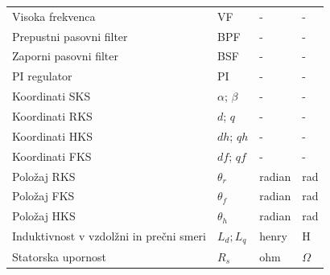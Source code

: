 \documentclass[a4paper,twoside,openright,12pt,slovene]{book}
\begin{document}
\begin{center}
\begin{tabular}{*{4}{l}}
        Visoka frekvenca                                           & VF                                     & -                    & -                      \\
        Prepustni pasovni filter                                   & BPF                                    & -                    & -                      \\
        Zaporni pasovni filter                                     & BSF                                    & -                    & -                      \\
        PI regulator                                               & PI                                     & -                    & -                      \\                                                    
        Koordinati SKS                                             & $\alpha$; $\beta$                      & -                    & -                      \\
        Koordinati RKS                                             & $d$; $q$                               & -                    & -                      \\
        Koordinati HKS                                             & $dh$; $qh$                             & -                    & -                      \\
        Koordinati FKS                                             & $df$; $qf$                             & -                    & -                      \\
        Položaj RKS                                                & $\theta_{r}$                           & radian               & rad                    \\
        Položaj FKS                                                & $\theta_{f}$                           & radian               & rad                    \\
        Položaj HKS                                                & $\theta_{h}$                           & radian               & rad                    \\
        Induktivnost v vzdolžni in prečni smeri                    & $L_d; L_q$                             & henry                & H                      \\
        Statorska upornost                                         & $R_s$                                  & ohm                  & $\Omega$               \\

\end{tabular}
\end{center}
\end{document}
